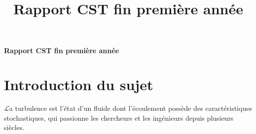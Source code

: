 \documentclass[a4paper,12pt]{article}
\title{\navy \textbf{Rapport CST fin première année} \color{black}}%
\date{}
\newcommand\bk{\color{black}}
\newcommand\navy{\color{navy}}
\numberwithin{equation}{section} %
\begin{document}
\begin{titlepage} \centering
\vspace*{\fill}
\Huge \navy \textbf{Rapport CST fin première année} \bk \normalsize
\vspace*{\fill}
\end{titlepage}
\newpage

\navy \section{Introduction du sujet}  \bk
\Large{$\mathscr{L}$}\normalsize a turbulence est l'état d'un fluide dont l'écoulement possède des caractéristiques stochastiques, qui passionne les chercheurs et les ingénieurs depuis plusieurs siècles. %
\end{document}
